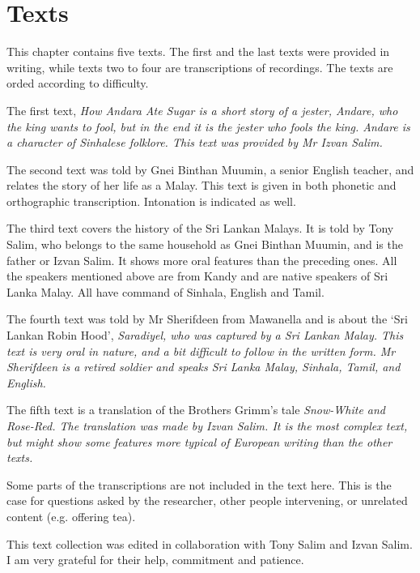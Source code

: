 \chapter{Texts}
This chapter contains five texts. The first and the last texts were provided in writing, while texts two to four are transcriptions of recordings. The texts are orded according to difficulty.

The first text, \em How Andara Ate Sugar \em is a short story of a jester, Andare, who the king wants to fool, but in the end it is the jester who fools the king. Andare is a character of Sinhalese folklore. This text was provided by Mr Izvan Salim.

The second text was told by Gnei Binthan Muumin, a senior English teacher,  and relates the story of her life as a Malay. This text is given in both phonetic and orthographic transcription. Intonation is indicated as well.

The third text covers the history of the Sri Lankan Malays. It is told by Tony Salim, who belongs to the same household as Gnei Binthan Muumin, and is the father or Izvan Salim. It shows more oral features than the preceding ones. All the speakers mentioned above are from Kandy and are native speakers of Sri Lanka Malay. All have command of Sinhala, English and Tamil.

The fourth text was told by Mr Sherifdeen from Mawanella and is about the `Sri Lankan Robin Hood', \em Saradiyel\em, who was captured by a Sri Lankan Malay. This text is very oral in nature, and a bit difficult to follow in the written form. Mr Sherifdeen is a retired soldier and speaks Sri Lanka Malay, Sinhala, Tamil, and English.

The fifth text is a translation of the Brothers Grimm's tale \em Snow-White and Rose-Red\em. The translation was made by Izvan Salim. It is the  most complex text, but might show some features more typical of European writing than the other texts.

Some parts of the transcriptions are not included in the text here. This is the case for questions asked by the researcher, other people intervening, or unrelated content (e.g. offering tea).

This text collection was edited in collaboration with Tony Salim and Izvan Salim. I am very grateful for their help, commitment and patience.
